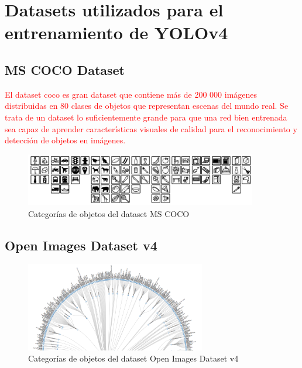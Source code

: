 \newpage

\section{Datasets utilizados para el entrenamiento de YOLOv4}
\label{sec:datasets-utilizados}

\subsection{MS COCO Dataset}
\label{subsec:coco-dataset}

\textcolor{red}{El dataset \gls{coco} es gran dataset que contiene más de 200 000 imágenes distribuidas en 80 clases de objetos que representan escenas del mundo real. Se trata de un dataset lo suficientemente grande para que una red bien entrenada sea capaz de aprender características visuales de calidad para el reconocimiento y detección de objetos en imágenes.}

\begin{figure}[ht]
\centering
\includegraphics[width=0.9\textwidth]{img/chapters/resultados/datasets/cocodataset.png}
\caption{\label{fig:cocodataset}Categorías de objetos del dataset MS COCO}
\end{figure}

\newpage

\subsection{Open Images Dataset v4}
\label{subsec:OIDv4-dataset}

\begin{figure}[ht]
\centering
\includegraphics[width=0.7\textwidth]{img/chapters/resultados/datasets/oid-classes.png}
\caption{\label{fig:oiddataset}Categorías de objetos del dataset Open Images Dataset v4}
\end{figure}


